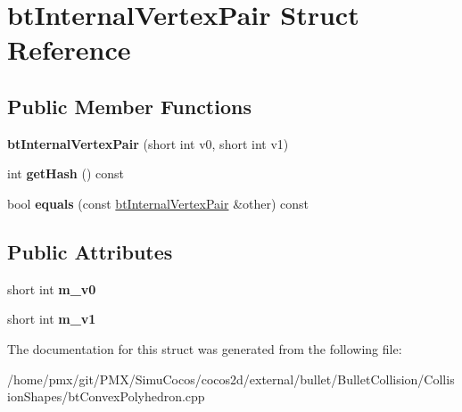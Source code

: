 \hypertarget{structbtInternalVertexPair}{}\section{bt\+Internal\+Vertex\+Pair Struct Reference}
\label{structbtInternalVertexPair}
\subsection*{Public Member Functions}
\begin{DoxyCompactItemize}
\item 
\mbox{\label{structbtInternalVertexPair_aae7c609e90ba34c17905dcf3ab90052b}} 
{\bfseries bt\+Internal\+Vertex\+Pair} (short int v0, short int v1)
\item 
\mbox{\label{structbtInternalVertexPair_a5342ed9fcf8e90d5cbb5710f9fe76248}} 
int {\bfseries get\+Hash} () const
\item 
\mbox{\label{structbtInternalVertexPair_abb765a22b3082c8a47a3e9fb9585dfc6}} 
bool {\bfseries equals} (const \hyperlink{structbtInternalVertexPair}{bt\+Internal\+Vertex\+Pair} \&other) const
\end{DoxyCompactItemize}
\subsection*{Public Attributes}
\begin{DoxyCompactItemize}
\item 
\mbox{\label{structbtInternalVertexPair_a5655e4633f313baff90aaa9ed7aa5048}} 
short int {\bfseries m\+\_\+v0}
\item 
\mbox{\label{structbtInternalVertexPair_a150a2e6ec8ccaf70b4d004d8c12529d7}} 
short int {\bfseries m\+\_\+v1}
\end{DoxyCompactItemize}


The documentation for this struct was generated from the following file\+:\begin{DoxyCompactItemize}
\item 
/home/pmx/git/\+P\+M\+X/\+Simu\+Cocos/cocos2d/external/bullet/\+Bullet\+Collision/\+Collision\+Shapes/bt\+Convex\+Polyhedron.\+cpp\end{DoxyCompactItemize}
